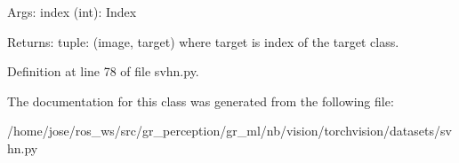 \begin{DoxyVerb}Args:
    index (int): Index

Returns:
    tuple: (image, target) where target is index of the target class.
\end{DoxyVerb}
 

Definition at line 78 of file svhn.\+py.



The documentation for this class was generated from the following file\+:\begin{DoxyCompactItemize}
\item 
/home/jose/ros\+\_\+ws/src/gr\+\_\+perception/gr\+\_\+ml/nb/vision/torchvision/datasets/svhn.\+py\end{DoxyCompactItemize}
